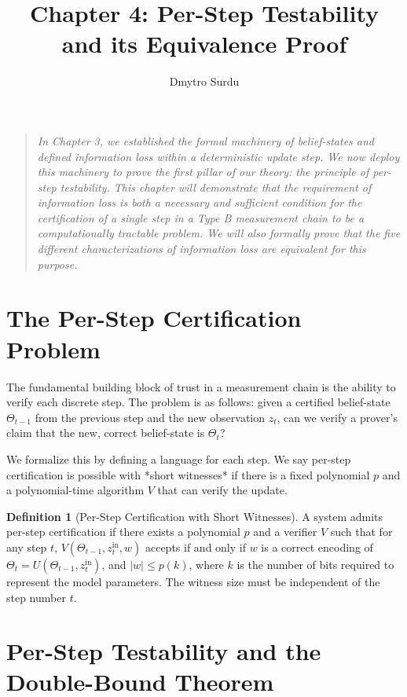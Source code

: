 \documentclass[12pt]{article}
\title{\textbf{Chapter 4: Per-Step Testability and its Equivalence Proof}}
\author{Dmytro Surdu}
\date{}
\theoremstyle{definition}
\newtheorem{definition}{Definition}[section]
\theoremstyle{plain}
\begin{document}
\maketitle

\begin{quote}
\textit{In Chapter 3, we established the formal machinery of belief-states and defined information loss within a deterministic update step. We now deploy this machinery to prove the first pillar of our theory: the principle of per-step testability. This chapter will demonstrate that the requirement of information loss is both a necessary and sufficient condition for the certification of a single step in a Type B measurement chain to be a computationally tractable problem. We will also formally prove that the five different characterizations of information loss are equivalent for this purpose.}
\end{quote}

\section{The Per-Step Certification Problem}

The fundamental building block of trust in a measurement chain is the ability to verify each discrete step. The problem is as follows: given a certified belief-state $\Theta_{t-1}$ from the previous step and the new observation $z_t$, can we verify a prover's claim that the new, correct belief-state is $\Theta_t$?

We formalize this by defining a language for each step. We say per-step certification is possible with *short witnesses* if there is a fixed polynomial $p$ and a polynomial-time algorithm $V$ that can verify the update.

\begin{definition}[Per-Step Certification with Short Witnesses]
A system admits per-step certification if there exists a polynomial $p$ and a verifier $V$ such that for any step $t$, $V(\Theta_{t-1}, z^{\text{in}}_t, w)$ accepts if and only if $w$ is a correct encoding of $\Theta_t = U(\Theta_{t-1}, z^{\text{in}}_t)$, and $|w| \le p(k)$, where $k$ is the number of bits required to represent the model parameters. The witness size must be independent of the step number $t$.
\end{definition}

\section{Per-Step Testability and the Double-Bound Theorem}
\end{document}
